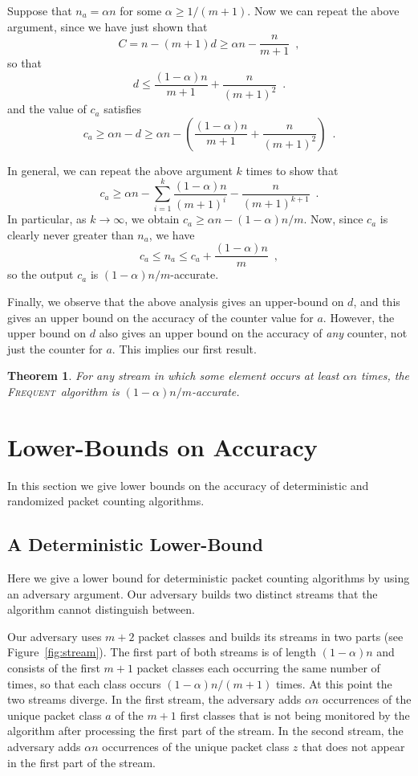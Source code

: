 \documentclass[charterfonts,lotsofwhite]{patmorin}
\newcommand{\frequent}{\textsc{Frequent}}
\newcommand{\seclabel}[1]{\label{sec:#1}}
\newcommand{\figref}[1]{\mbox{Figure~\ref{fig:#1}}}
\newtheorem{thm}{Theorem}{\bfseries}{\itshape}
\begin{document}
Suppose that $n_a=\alpha n$ for some $\alpha\ge 1/(m+1)$.  Now we can
repeat the above argument, since we have just shown that
\[
C = n - (m+1)d \ge \alpha n- \frac{n}{m+1} \enspace ,
\]
so that
\[
     d \le \frac{(1-\alpha) n}{m+1} + \frac{n}{(m+1)^2} \enspace . 
\]
and the value of $c_a$ satisfies
\[
   c_a \ge \alpha n - d \ge \alpha n - \left(\frac{(1-\alpha) n}{m+1} + \frac{n}{(m+1)^2}\right) \enspace . 
\]

In general, we can repeat the above argument $k$ times to show that
\[
  c_a \ge \alpha n - \sum_{i=1}^k \frac{(1-\alpha)n}{(m+1)^i} 
  - \frac{n}{(m+1)^{k+1}} \enspace .
\]
In particular, as $k\rightarrow\infty$, we obtain $c_a \ge \alpha
n-(1-\alpha)n/m$.  Now, since $c_a$ is clearly never greater than
$n_a$, we have
\[
    c_a \le n_a \le c_a + \frac{(1-\alpha)n}{m} \enspace ,
\]
so the output $c_a$ is $(1-\alpha)n/m$-accurate.

Finally, we observe that the above analysis gives an upper-bound on
$d$, and this gives an upper bound on the accuracy of the counter
value for $a$.  However, the upper bound on $d$ also gives an upper
bound on the accuracy of \emph{any} counter, not just the counter for
$a$.  This implies our first result.

\begin{thm}
For any stream in which some element occurs at least $\alpha n$ times,
the \frequent\ algorithm is $(1-\alpha)n/m$-accurate.
\end{thm}

\section{Lower-Bounds on Accuracy}\seclabel{lower-bounds}

In this section we give lower bounds on the accuracy of deterministic
and randomized packet counting algorithms. 

\subsection{A Deterministic Lower-Bound}

Here we give a lower bound for deterministic packet counting
algorithms by using an adversary argument.  Our adversary builds two
distinct streams that the algorithm cannot distinguish between.

Our adversary uses $m+2$ packet classes and builds its streams in two
parts (see \figref{stream}).  The first part of both streams is of
length $(1-\alpha)n$ and consists of the first $m+1$ packet classes
each occurring the same number of times, so that each class occurs
$(1-\alpha)n/(m+1)$ times.  At this point the two streams diverge.  In
the first stream, the adversary adds $\alpha n$ occurrences of the
unique packet class $a$ of the $m+1$ first classes that is not being
monitored by the algorithm after processing the first part of the
stream. In the second stream, the adversary adds $\alpha n$ occurrences
of the unique packet class $z$ that does not appear in the first part
of the stream.
\end{document}

